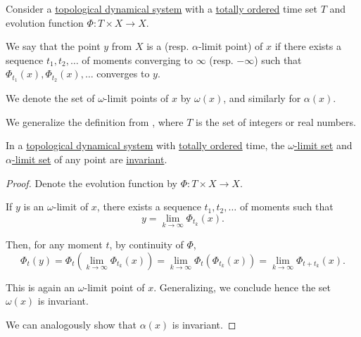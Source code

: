 \begin{definition}\label{def:dynamical_system_limit_point}
  Consider a \hyperref[def:topological_dynamical_system]{topological dynamical system} with a \hyperref[def:totally_ordered_set]{totally ordered} time set \( T \) and evolution function \( \Phi: T \times X \to X \).

  We say that the point \( y \) from \( X \) is a  (resp. \( \alpha \)-limit point) of \( x \) if there exists a sequence \( t_1, t_2, \ldots \) of moments converging to \( \infty \) (resp. \( -\infty \)) such that \( \Phi_{t_1}(x), \Phi_{t_2}(x), \ldots \) converges to \( y \).

  We denote the set of \( \omega \)-limit points of \( x \) by \( \omega(x) \), and similarly for \( \alpha(x) \).
\end{definition}
\begin{comments}
  \item We generalize the definition from \cite[def. 1.6.2]{HasselblattKatok1995DynamicalSystems}, where \( T \) is the set of integers or real numbers.
\end{comments}

\begin{proposition}\label{thm:limit_point_set_is_invariant}
  In a \hyperref[def:topological_dynamical_system]{topological dynamical system} with \hyperref[def:totally_ordered_set]{totally ordered} time, the \hyperref[def:dynamical_system_limit_point]{\( \omega \)-limit set} and \hyperref[def:dynamical_system_limit_point]{\( \alpha \)-limit set} of any point are \hyperref[def:dynamical_system_invariant_set]{invariant}.
\end{proposition}
\begin{proof}
  Denote the evolution function by \( \Phi: T \times X \to X \).

  If \( y \) is an \( \omega \)-limit of \( x \), there exists a sequence \( t_1, t_2, \ldots \) of moments such that
  \begin{equation*}
    y = \lim_{k \to \infty} \Phi_{t_k}(x).
  \end{equation*}

  Then, for any moment \( t \), by continuity of \( \Phi \),
  \begin{equation*}
    \Phi_t(y)
    =
    \Phi_t(\lim_{k \to \infty} \Phi_{t_k}(x))
    =
    \lim_{k \to \infty} \Phi_t(\Phi_{t_k}(x))
    =
    \lim_{k \to \infty} \Phi_{t + t_k}(x).
  \end{equation*}

  This is again an \( \omega \)-limit point of \( x \). Generalizing, we conclude hence the set \( \omega(x) \) is invariant.

  We can analogously show that \( \alpha(x) \) is invariant.
\end{proof}

